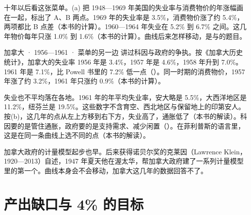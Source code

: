十年以后看这张菜单。(a) 把 1948—1969 年美国的失业率与消费物价的年涨幅画在一起，标出了 A、B 两点\cite{erp1971}。1969 年的失业率是 3.5\%，消费物价涨了约 5.4\%，两项都比 B 点差（本书的计算）。1960—1964 年失业在 5.2\% 到 6.7\% 之间。这几年物价每年只涨 1.0\% 到 1.6\%（本书的计算）。曲线后来怎样移动，是与的题目。


\begin{case}{加拿大 · 1956—1961 · 菜单的另一边}
讲过科因与政府的争执。按《加拿大历史统计》，加拿大的失业率 1956 年是 3.4\%，1957 年是 4.6\%，1958 年升到 7.0\%\cite{hsc38}。1961 年是 7.1\%，比 Powell 书里的 7.2\% 低一点（）\cite{hsc38}。同一时期的消费物价，1957 年涨了约 3.2\%，1961 年只涨约 0.9\%（本书的计算）\cite{hsc38}。

失业也不平均落在各地。1961 年的年平均失业率，安大略是 5.5\%，大西洋地区是 11.2\%，纽芬兰是 19.5\%\cite{hsc38}。这些数字不含育空、西北地区与保留地上的印第安人\cite{hsc38}。按(b)，这几年的点从左上方移到右下方，失业高了，通胀低了（本书的解读）。科因要的是管住通胀，政府要的是支持需求、减少闲置（）。在菲利普斯的语言里，这是在同一条曲线上选不同的点（本书的解读）。

加拿大政府的计量模型起步也早。后来获得诺贝尔奖的克莱因（Lawrence Klein，1920—2013）自述，1947 年夏天他在渥太华，帮加拿大政府建了一系列计量模型里的第一个\cite{nobel1980bio,loc38}。曲线本身会不会移动，加拿大这几年的数据回答不了。
\end{case}

\section{产出缺口与 4\% 的目标}\label{sec:phillips-gap}

